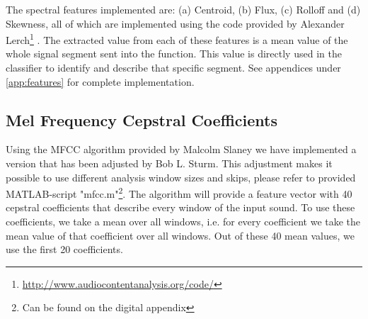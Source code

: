 The spectral features implemented are: (a) Centroid, (b) Flux, (c) Rolloff and (d) Skewness, all of which are implemented using the code provided by Alexander Lerch\footnote{\url{http://www.audiocontentanalysis.org/code/}} \cite{ACA}. The extracted value from each of these features is a mean value of the whole signal segment sent into the function. This value is directly used in the classifier to identify and describe that specific segment. See appendices under \ref{app:features} for complete implementation.

\subsection{Mel Frequency Cepstral Coefficients}
Using the MFCC algorithm provided by Malcolm Slaney \cite{Slaney} we have implemented a version that has been adjusted by Bob L. Sturm. This adjustment makes it possible to use different analysis window sizes and skips, please refer to provided MATLAB-script "mfcc.m"\footnote{Can be found on the digital appendix}. The algorithm will provide a feature vector with 40 cepstral coefficients that describe every window of the input sound. To use these coefficients, we take a mean over all windows, i.e. for every coefficient we take the mean value of that coefficient over all windows. Out of these 40 mean values, we use the first 20 coefficients.